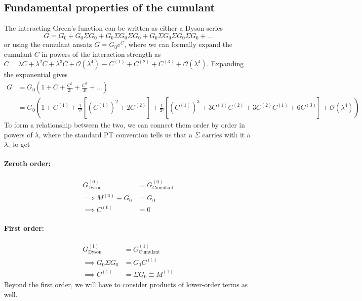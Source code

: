 \subsection{Fundamental properties of the cumulant}

The interacting Green's function can be written as either a Dyson series
\begin{equation}
    G = G_0 + G_0 \Sigma G_0 + G_0 \Sigma G_0 \Sigma G_0 + G_0 \Sigma G_0 \Sigma G_0 \Sigma G_0 + \ldots
\end{equation}
or using the cumulant ansatz $G = G_0 e^{C}$, where we can formally expand the cumulant $C$ in powers of the interaction strength as $C = \lambda C +\lambda ^2 C + \lambda ^3 C + \mathcal{O}(\lambda^4) \equiv C^{(1)} + C^{(2)} + C^{(3)} + \mathcal{O}(\lambda^4)$. Expanding the exponential gives
\begin{align}
      G&= G_0 \left( 1 + C + \frac{C^2}{2!} + \frac{C^3}{3!} + \ldots \right)\\
&= G_0 \left( 1+C^{(1)}+\frac{1}{2!}\left[\left(C^{(1)}\right)^2+2 C^{(2)}\right]+\frac{1}{3!}\left[\left(C^{(1)}\right)^3+3 C^{(1)} C^{(2)}+3 C^{(2)} C^{(1)}+6 C^{(3)}\right] + \mathcal{O}(\lambda^4) \right) 
\end{align}
To form a relationship between the two, we can connect them order by order in powers of $\lambda$, where the standard PT convention tells us that a $\Sigma $ carries with it a $\lambda$, to get
\paragraph{Zeroth order:}
\begin{align}
    G_{\text{Dyson}}^{(0)} &= G_{\text{Cumulant}}^{(0)} \\
\implies M^{(0)} \equiv G_0 &= G_0 \\
\implies C^{(0)} &= 0
\end{align}

\paragraph{First order:}
\begin{align}
G^{(1)}_{\text{Dyson}} &= G^{(1)}_{\text{Cumulant}} \\
    \implies G_0 \Sigma G_0 &= G_0 C^{(1)} \\
\implies C^{(1)} &= \Sigma G_0 \equiv M^{(1)}
\end{align}
Beyond the first order, we will have to consider products of lower-order terms as well.
